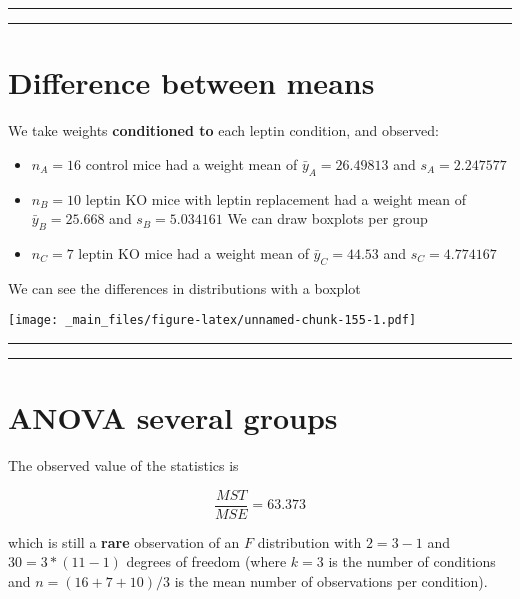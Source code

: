 \documentclass[
]{book}
\begin{document}
\begin{center}\rule{0.5\linewidth}{0.5pt}\end{center}

\begin{center}\rule{0.5\linewidth}{0.5pt}\end{center}

\hypertarget{difference-between-means-9}{%
\section{Difference between means}\label{difference-between-means-9}}

We take weights \textbf{conditioned to} each leptin condition, and observed:

\begin{itemize}
\item
  \(n_A=16\) control mice had a weight mean of \(\bar{y}_A=26.49813\) and \(s_A=2.247577\)
\item
  \(n_B=10\) leptin KO mice with leptin replacement had a weight mean of \(\bar{y}_B=25.668\) and \(s_B=5.034161\)
  We can draw boxplots per group
\item
  \(n_C=7\) leptin KO mice had a weight mean of \(\bar{y}_C=44.53\) and \(s_C=4.774167\)
\end{itemize}

We can see the differences in distributions with a boxplot

\texttt{[image: \_main\_files/figure-latex/unnamed-chunk-155-1.pdf]}

\begin{center}\rule{0.5\linewidth}{0.5pt}\end{center}

\begin{center}\rule{0.5\linewidth}{0.5pt}\end{center}

\hypertarget{anova-several-groups-3}{%
\section{ANOVA several groups}\label{anova-several-groups-3}}

The observed value of the statistics is

\[\frac{MST}{MSE}=63.373\]

which is still a \textbf{rare} observation of an \(F\) distribution with \(2=3-1\) and \(30=3*(11-1)\) degrees of freedom (where \(k=3\) is the number of conditions and \(n=(16 + 7 + 10)/3\) is the mean number of observations per condition).
\end{document}
